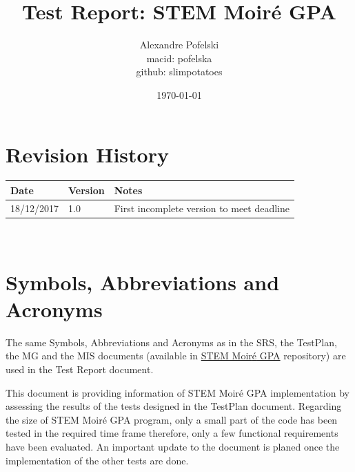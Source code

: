 \documentclass[12pt, titlepage]{article}
\newcommand{\progname}{STEM Moir{\'e} GPA}
\begin{document}
\title{Test Report: STEM Moir{\'e} GPA} 
\author{Alexandre Pofelski \\
		macid: pofelska \\
		github: slimpotatoes}
\date{\today}
	
\maketitle


\section{Revision History}

\begin{tabularx}{\textwidth}{p{3cm}p{2cm}X}
\toprule {\bf Date} & {\bf Version} & {\bf Notes}\\
\midrule
18/12/2017 & 1.0 & First incomplete version to meet deadline\\
\bottomrule
\end{tabularx}

~\newpage

\section{Symbols, Abbreviations and Acronyms}

The same Symbols, Abbreviations and Acronyms as in the SRS, the TestPlan, the 
MG and the MIS documents (available in 
\href{https://github.com/slimpotatoes/STEM_Moire_GPA}{\progname{}} repository) 
are used in the Test Report document. 

\newpage

\tableofcontents

\listoftables %

\listoffigures %

\newpage


This document is providing information of \progname{} implementation by 
assessing the results of the tests designed in the TestPlan document. Regarding 
the size of \progname{} program, only a small part of the code has been tested 
in the required time frame therefore, only a few functional requirements have 
been evaluated. An important update to the document is planed once the 
implementation of the other tests are done.
\newline
\end{document}
